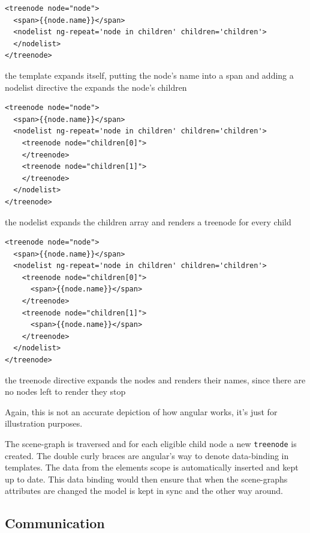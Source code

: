 \begin{listing}[H]
  \begin{verbatim}
<treenode node="node">
  <span>{{node.name}}</span>
  <nodelist ng-repeat='node in children' children='children'>
  </nodelist>
</treenode>
  \end{verbatim}
  \caption{the template expands itself, putting the node's name into a span and adding a nodelist directive the expands the node's children}
\end{listing}

\begin{listing}[H]
  \begin{verbatim}
<treenode node="node">
  <span>{{node.name}}</span>
  <nodelist ng-repeat='node in children' children='children'>
    <treenode node="children[0]">
    </treenode>
    <treenode node="children[1]">
    </treenode>
  </nodelist>
</treenode>
  \end{verbatim}
  \caption{the nodelist expands the children array and renders a treenode for every child}
\end{listing}

\begin{listing}[H]
  \begin{verbatim}
<treenode node="node">
  <span>{{node.name}}</span>
  <nodelist ng-repeat='node in children' children='children'>
    <treenode node="children[0]">
      <span>{{node.name}}</span>
    </treenode>
    <treenode node="children[1]">
      <span>{{node.name}}</span>
    </treenode>
  </nodelist>
</treenode>
  \end{verbatim}
  \caption{the treenode directive expands the nodes and renders their names, since there are no nodes left to render they stop}
\end{listing}


Again, this is not an accurate depiction of how angular works, it's just
for illustration purposes.

The scene-graph is traversed and for each eligible child node a new
\texttt{treenode} is created. The double curly braces are angular's way
to denote data-binding in templates. The data from the elements scope is
automatically inserted and kept up to date. This data binding would then
ensure that when the scene-graphs attributes are changed the model is
kept in sync and the other way around.

\subsection{Communication}\label{interaction}
